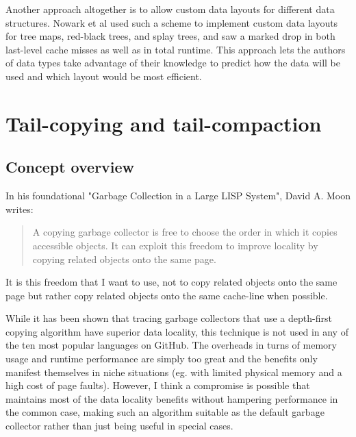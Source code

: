 \documentclass[a4paper,oneside]{memoir}
\begin{document}
Another approach altogether is to allow custom
data layouts for different data structures. Nowark et al used such a scheme to
implement custom data layouts for tree maps, red-black trees, and splay trees,
and saw a marked drop in both last-level cache misses as well as in total
runtime.\cite{Novark:2006} This approach lets the authors of data types take
advantage of their knowledge to predict how the data will be used and which
layout would be most efficient.

\chapter{Tail-copying and tail-compaction}

\section{Concept overview}
\label{concept_overview}

In his foundational "Garbage Collection in a Large LISP System", David A. Moon writes:
\blockquote{A copying garbage collector is free to choose the order in which
it copies accessible objects. It can exploit this freedom to improve locality by
copying related objects onto the same page.}
\cite{Moon:1984}
It is this freedom that I want to use, not to copy related objects onto the same
page but rather copy related objects onto the same cache-line when possible.

While it has been shown that tracing garbage collectors that use a depth-first
copying algorithm have superior data locality, this technique is not used in any
of the ten most popular languages on GitHub. The overheads in turns of memory
usage and runtime performance are simply too great and the benefits only
manifest themselves in niche situations (eg. with limited physical memory and
a high cost of page faults). However, I think a compromise is possible that
maintains most of the data locality benefits without hampering performance in
the common case, making such an algorithm suitable as the default garbage
collector rather than just being useful in special cases.
\end{document}
